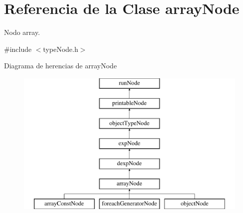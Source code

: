 \hypertarget{classarrayNode}{\section{Referencia de la Clase array\-Node}
\label{classarrayNode}
}


Nodo array.  




{\ttfamily \#include $<$type\-Node.\-h$>$}

Diagrama de herencias de array\-Node\begin{figure}[H]
\begin{center}
\leavevmode
\includegraphics[height=7.000000cm]{classarrayNode}
\end{center}
\end{figure}

